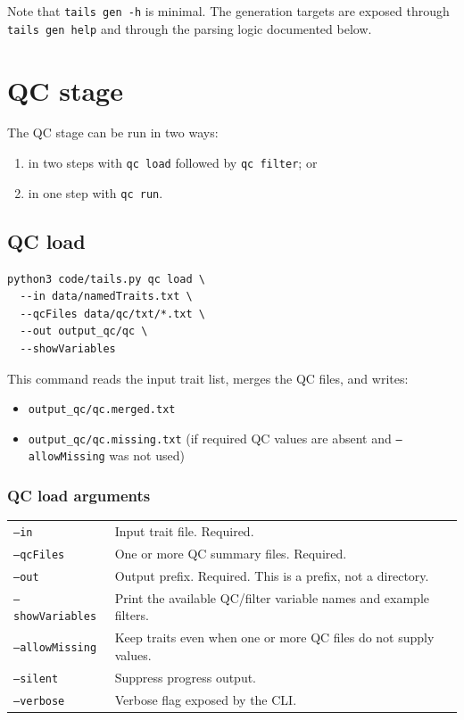 \documentclass[11pt]{article}
\begin{document}
Note that \texttt{tails gen -h} is minimal. The generation targets are exposed through \texttt{tails gen help} and through the parsing logic documented below.

\section{QC stage}

The QC stage can be run in two ways:

\begin{enumerate}[nosep]
\item in two steps with \texttt{qc load} followed by \texttt{qc filter}; or
\item in one step with \texttt{qc run}.
\end{enumerate}

\subsection{QC load}

\begin{verbatim}
python3 code/tails.py qc load \
  --in data/namedTraits.txt \
  --qcFiles data/qc/txt/*.txt \
  --out output_qc/qc \
  --showVariables
\end{verbatim}

This command reads the input trait list, merges the QC files, and writes:

\begin{itemize}[nosep]
\item \texttt{output\_qc/qc.merged.txt}
\item \texttt{output\_qc/qc.missing.txt} (if required QC values are absent and \texttt{--allowMissing} was not used)
\end{itemize}

\subsubsection*{QC load arguments}

\begin{longtable}{p{3.2cm}p{10.8cm}}
\texttt{--in} & Input trait file. Required. \\
\texttt{--qcFiles} & One or more QC summary files. Required. \\
\texttt{--out} & Output prefix. Required. This is a prefix, not a directory. \\
\texttt{--showVariables} & Print the available QC/filter variable names and example filters. \\
\texttt{--allowMissing} & Keep traits even when one or more QC files do not supply values. \\
\texttt{--silent} & Suppress progress output. \\
\texttt{--verbose} & Verbose flag exposed by the CLI. \\
\end{longtable}
\end{document}
